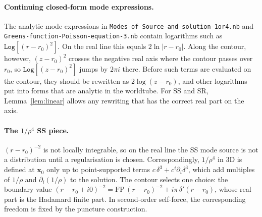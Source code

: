\documentclass[11pt,a4paper]{article}
\newcommand{\x}{\mathbf{x}}
\newcommand{\nb}[1]{\nolinkurl{#1}}
\newcommand{\code}[1]{\texttt{#1}}
\begin{document}
\paragraph{Continuing closed-form mode expressions.}
The analytic mode expressions in \nb{Modes-of-Source-and-solution-1or4.nb} and \nb{Greens-function-Poisson-equation-3.nb} contain logarithms such as $\code{Log}[(r-r_0)^2]$.
On the real line this equals $2\ln|r-r_0|$.
Along the contour, however, $(z-r_0)^2$ crosses the negative real axis where the contour passes over $r_0$, so $\code{Log}[(z-r_0)^2]$ jumps by $2\pi i$ there.
Before such terms are evaluated on the contour, they should be rewritten as $2\log(z-r_0)$, and other logarithms put into forms that are analytic in the worldtube.
For SS and SR, Lemma~\ref{lem:linear} allows any rewriting that has the correct real part on the axis.

\paragraph{The $1/\rho^4$ SS piece.}
$(r-r_0)^{-2}$ is not locally integrable, so on the real line the SS mode source is not a distribution until a regularisation is chosen.
Correspondingly, $1/\rho^4$ in 3D is defined at $\x_0$ only up to point-supported terms $c\,\delta^3+c^i\partial_i\delta^3$, which add multiples of $1/\rho$ and $\partial_i(1/\rho)$ to the solution.
The contour selects one choice: the boundary value $(r-r_0+i0)^{-2}=\mathrm{FP}\,(r-r_0)^{-2}+i\pi\,\delta'(r-r_0)$, whose real part is the Hadamard finite part.
In second-order self-force, the corresponding freedom is fixed by the puncture construction.
\end{document}

